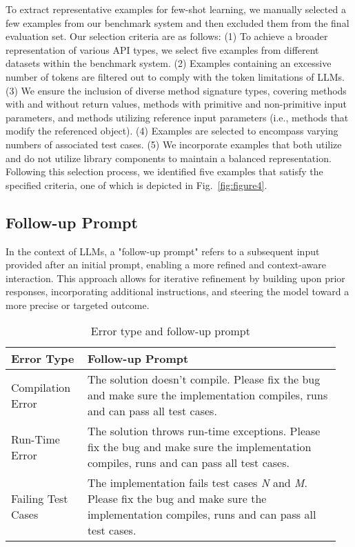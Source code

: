 To extract representative examples for few-shot learning, we manually selected a few examples from our benchmark system and then excluded them from the final evaluation set. Our selection criteria are as follows:
(1) To achieve a broader representation of various API types, we select five examples from different datasets within the benchmark system. 
(2) Examples containing an excessive number of tokens are filtered out to comply with the token limitations of LLMs.
(3) We ensure the inclusion of diverse method signature types, covering methods with and without return values, methods with primitive and non-primitive input parameters, and methods utilizing reference input parameters (i.e., methods that modify the referenced object).   
(4) Examples are selected to encompass varying numbers of associated test cases.
(5) We incorporate examples that both utilize and do not utilize library components to maintain a balanced representation.
Following this selection process, we identified five examples that satisfy the specified criteria, one of which is depicted in Fig.~\ref{fig:figure4}.

\subsection{Follow-up Prompt}
\label{sec:sec34}
In the context of LLMs, a "follow-up prompt" refers to a subsequent input provided after an initial prompt, enabling a more refined and context-aware interaction. This approach allows for iterative refinement by building upon prior responses, incorporating additional instructions, and steering the model toward a more precise or targeted outcome.
\begin{table}[h]
    \centering
    \begin{tabular}{p{0.22\linewidth} | p{0.73\linewidth}}
        \toprule
        \textbf{Error Type} & \textbf{Follow-up Prompt} \\
        \hline
        Compilation Error & The solution doesn't compile. Please fix the bug and make sure the implementation compiles, runs and can pass all test cases.\\
        \hline
        Run-Time Error & The solution throws run-time exceptions. Please fix the bug and make sure the implementation compiles, runs and can pass all test cases. \\
        \hline
        Failing Test Cases & The implementation fails test cases \textit{N} and \textit{M}. Please fix the bug and make sure the implementation compiles, runs and can pass all test cases.\\
        \bottomrule
    \end{tabular}
    \caption{Error type and follow-up prompt}
    \label{tab:table1}
\end{table}

